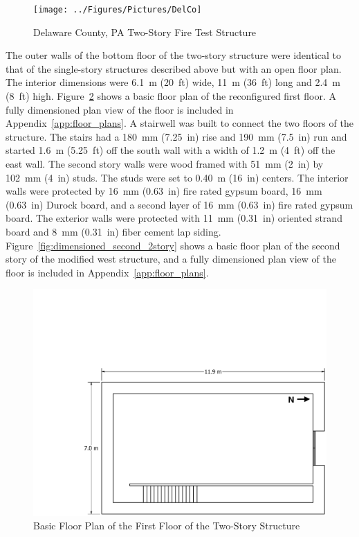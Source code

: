 \documentclass[12pt,oneside]{book}
\begin{document}
\begin{figure}[!ht]
	\texttt{[image: ../Figures/Pictures/DelCo]}
	\caption{Delaware County, PA Two-Story Fire Test Structure}
	\label{fig:delco_2story}
\end{figure}

The outer walls of the bottom floor of the two-story structure were identical to that of the single-story structures described above but with an open floor plan. The interior dimensions were 6.1~m (20~ft) wide, 11~m (36~ft) long and 2.4~m (8~ft) high. Figure~\ref{fig:dimensioned_first_2story} shows a basic floor plan of the reconfigured first floor. A fully dimensioned plan view of the floor is included in Appendix~\ref{app:floor_plans}. A stairwell was built to connect the two floors of the structure. The stairs had a 180~mm (7.25~in) rise and 190~mm (7.5~in) run and started 1.6~m (5.25~ft) off the south wall with a width of 1.2~m (4~ft) off the east wall. The second story walls were wood framed with 51~mm (2~in) by 102~mm (4~in) studs. The studs were set to 0.40~m (16~in) centers. The interior  walls were protected by 16~mm (0.63~in) fire rated gypsum board, 16~mm (0.63~in) Durock board, and a second layer of 16~mm (0.63~in) fire rated gypsum board. The exterior walls were protected with 11~mm (0.31~in) oriented strand board and 8~mm (0.31~in) fiber cement lap siding. Figure~\ref{fig:dimensioned_second_2story} shows a basic floor plan of the second story of the modified west structure, and a fully dimensioned plan view of the floor is included in Appendix~\ref{app:floor_plans}.

\begin{figure}[!ht]
	\includegraphics[width=\columnwidth]{../../DelCo_2014_2015/Drawings/PDFs/CAFS/West_Structure_1st_Floor_Plain}
	\caption{Basic Floor Plan of the First Floor of the Two-Story Structure}
	\label{fig:dimensioned_first_2story}
\end{figure}
\end{document}
